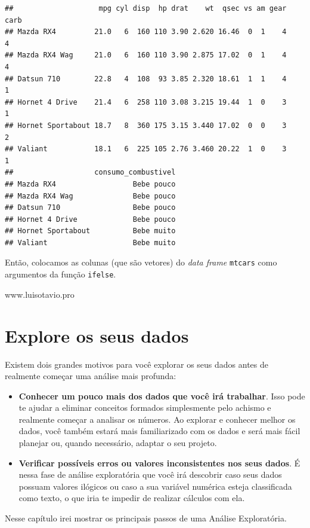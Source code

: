 \documentclass[
]{book}
\begin{document}
\begin{verbatim}
##                    mpg cyl disp  hp drat    wt  qsec vs am gear carb
## Mazda RX4         21.0   6  160 110 3.90 2.620 16.46  0  1    4    4
## Mazda RX4 Wag     21.0   6  160 110 3.90 2.875 17.02  0  1    4    4
## Datsun 710        22.8   4  108  93 3.85 2.320 18.61  1  1    4    1
## Hornet 4 Drive    21.4   6  258 110 3.08 3.215 19.44  1  0    3    1
## Hornet Sportabout 18.7   8  360 175 3.15 3.440 17.02  0  0    3    2
## Valiant           18.1   6  225 105 2.76 3.460 20.22  1  0    3    1
##                   consumo_combustivel
## Mazda RX4                  Bebe pouco
## Mazda RX4 Wag              Bebe pouco
## Datsun 710                 Bebe pouco
## Hornet 4 Drive             Bebe pouco
## Hornet Sportabout          Bebe muito
## Valiant                    Bebe muito
\end{verbatim}

Então, colocamos as colunas (que são vetores) do \emph{data frame}
\texttt{mtcars} como argumentos da função \texttt{ifelse}.

www.luisotavio.pro

\hypertarget{explore-os-seus-dados}{%
\chapter{Explore os seus dados}\label{explore-os-seus-dados}}

Existem dois grandes motivos para você explorar os seus dados antes de
realmente começar uma análise mais profunda:

\begin{itemize}
\item
  \textbf{Conhecer um pouco mais dos dados que você irá trabalhar}. Isso
  pode te ajudar a eliminar conceitos formados simplesmente pelo achismo
  e realmente começar a analisar os números. Ao explorar e conhecer
  melhor os dados, você também estará mais familiarizado com os dados e
  será mais fácil planejar ou, quando necessário, adaptar o seu projeto.
\item
  \textbf{Verificar possíveis erros ou valores inconsistentes nos seus
  dados}. É nessa fase de análise exploratória que você irá descobrir
  caso seus dados possuam valores ilógicos ou caso a sua variável
  numérica esteja classificada como texto, o que iria te impedir de
  realizar cálculos com ela.
\end{itemize}

Nesse capítulo irei mostrar os principais passos de uma Análise
Exploratória.
\end{document}
